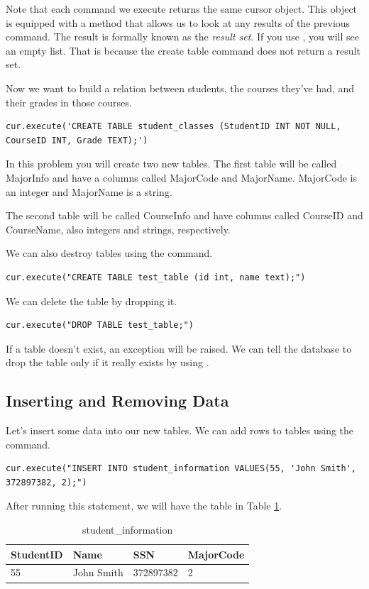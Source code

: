 Note that each command we execute returns the same cursor object.  This object is equipped with a method that allows us to look
at any results of the previous command.  The result is formally known as the \emph{result set}.
If you use , you will see an empty list.
That is because the create table command does not return a result set.

Now we want to build a relation between students, the courses they've had, and their grades in those courses.
\begin{lstlisting}
cur.execute('CREATE TABLE student_classes (StudentID INT NOT NULL, CourseID INT, Grade TEXT);')
\end{lstlisting}

\begin{problem}
In this problem you will create two new tables.  The first table will be called MajorInfo and have a columns called MajorCode and MajorName.
MajorCode is an integer and MajorName is a string.

The second table will be called CourseInfo and have columns called CourseID and CourseName, also integers and strings, respectively.
\label{prob:new_tables}
\end{problem}

We can also destroy tables using the  command.
\begin{lstlisting}
cur.execute("CREATE TABLE test_table (id int, name text);")
\end{lstlisting}
We can delete the table by dropping it.
\begin{lstlisting}
cur.execute("DROP TABLE test_table;")
\end{lstlisting}
If a table doesn't exist, an exception will be raised.
We can tell the database to drop the table only if it really exists by using .

\subsection*{Inserting and Removing Data}
Let's insert some data into our new tables.
We can add rows to tables using the  command.
\begin{lstlisting}
cur.execute("INSERT INTO student_information VALUES(55, 'John Smith', 372897382, 2);")
\end{lstlisting}
After running this statement, we will have the table in Table \ref{table:student_information1}.
\begin{table}
\begin{tabular}{|l|l|l|l|}
\hline
StudentID & Name & SSN & MajorCode \\
\hline
55 & John Smith & 372897382 & 2 \\
\hline
\end{tabular}
\caption{student\_information}
\label{table:student_information1}
\end{table}

